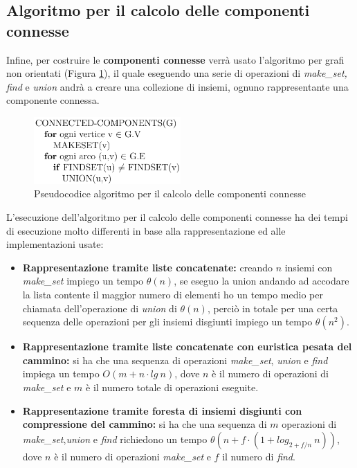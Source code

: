 \documentclass[12pt]{article}
\begin{document}
    \subsection{Algoritmo per il calcolo delle componenti connesse}
    Infine, per costruire le \textbf{componenti connesse} verrà usato l'algoritmo per grafi non orientati (Figura \ref{fig:cc_pseudocode}), il quale eseguendo una serie di operazioni di \textit{make\_set, find} e \textit{union} andrà a creare una collezione di insiemi, ognuno rappresentante una componente connessa.\\
    \begin{figure}[h]
        \centering
        \includegraphics[width=0.5\textwidth]{images/cc_pseudocode.png }
        \caption{Pseudocodice algoritmo per il calcolo delle componenti connesse}
        \label{fig:cc_pseudocode}
    \end{figure}

\noindent L'esecuzione dell'algoritmo per il calcolo delle componenti connesse ha dei tempi di esecuzione molto differenti in base alla rappresentazione ed alle implementazioni usate:
    \begin{itemize}
        \item \textbf{Rappresentazione tramite liste concatenate:} creando $n$ insiemi con \textit{make\_set} impiego un tempo $\theta(n)$, se eseguo la union andando ad accodare la lista contente il maggior numero di elementi ho un tempo medio per chiamata dell'operazione di \textit{union} di $\theta(n)$, perciò in totale per una certa sequenza delle operazioni per gli insiemi disgiunti impiego un tempo $\theta(n^2)$.

        \item \textbf{Rappresentazione tramite liste concatenate con euristica pesata del cammino:} si ha che una sequenza di operazioni \emph{make\_set}, \emph{union} e \emph{find} impiega un tempo $O(m+n\cdot lg\ n)$, dove $n$ è il numero di operazioni di \emph{make\_set} e $m$ è il numero totale di operazioni eseguite.

        \item \textbf{Rappresentazione tramite foresta di insiemi disgiunti con compressione del cammino:} si ha che una sequenza di $m$ operazioni di \textit{make\_set},\textit{union} e \textit{find} richiedono un tempo $\theta(n + f\cdot (1 + log_{2+f/n}\ n))$, dove $n$ è il numero di operazioni \textit{make\_set} e $f$ il numero di \textit{find}.

    \end{itemize}
\end{document}
